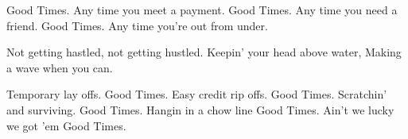 Good Times. 
Any time you meet a payment. 
Good Times. 
Any time you need a friend. 
Good Times. 
Any time you're out from under. 

Not getting hastled, not getting hustled. 
Keepin' your head above water, 
Making a wave when you can. 

Temporary lay offs. 
Good Times. 
Easy credit rip offs. 
Good Times. 
Scratchin' and surviving. 
Good Times. 
Hangin in a chow line 
Good Times. 
Ain't we lucky we got 'em 
Good Times.

